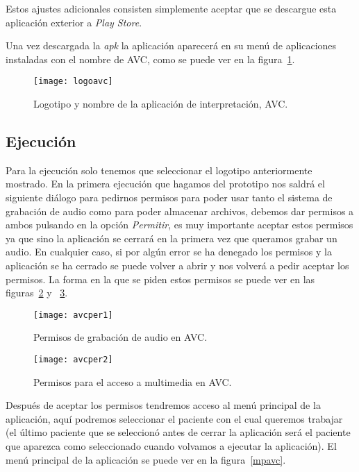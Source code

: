 Estos ajustes adicionales consisten simplemente aceptar que se descargue esta aplicación exterior a \textit{Play Store}.

Una vez descargada la \textit{apk} la aplicación aparecerá en su menú de aplicaciones instaladas con el nombre de AVC, como se puede ver en la figura~\ref{fig:logoavc}.

\begin{figure}[H]
	\centering
	\texttt{[image: logoavc]}
	\caption{Logotipo y nombre de la aplicación de interpretación, AVC.}
	\label{fig:logoavc}
\end{figure}

\subsection{Ejecución}
Para la ejecución solo tenemos que seleccionar el logotipo anteriormente mostrado. En la primera ejecución que hagamos del prototipo nos saldrá el siguiente diálogo para pedirnos permisos para poder usar tanto el sistema de grabación de audio como para poder almacenar archivos, debemos dar permisos a ambos pulsando en la opción \textit{Permitir}, es muy importante aceptar estos permisos ya que sino la aplicación se cerrará en la primera vez que queramos grabar un audio. En cualquier caso, si por algún error se ha denegado los permisos y la aplicación se ha cerrado se puede volver a abrir y nos volverá a pedir aceptar los permisos. La forma en la que se piden estos permisos se puede ver en las figuras~\ref{fig:avcper1} y ~\ref{fig:avcper2}.

\begin{figure}[H]
	\centering
	\texttt{[image: avcper1]}
	\caption{Permisos de grabación de audio en AVC.}
	\label{fig:avcper1}
\end{figure}

\begin{figure}[H]
	\centering
	\texttt{[image: avcper2]}
	\caption{Permisos para el acceso a multimedia en AVC.}
	\label{fig:avcper2}
\end{figure}

Después de aceptar los permisos tendremos acceso al menú principal de la aplicación, aquí podremos seleccionar el paciente con el cual queremos trabajar (el último paciente que se seleccionó antes de cerrar la aplicación será el paciente que aparezca como seleccionado cuando volvamos a ejecutar la aplicación). El menú principal de la aplicación se puede ver en la figura~\ref{mpavc}.

